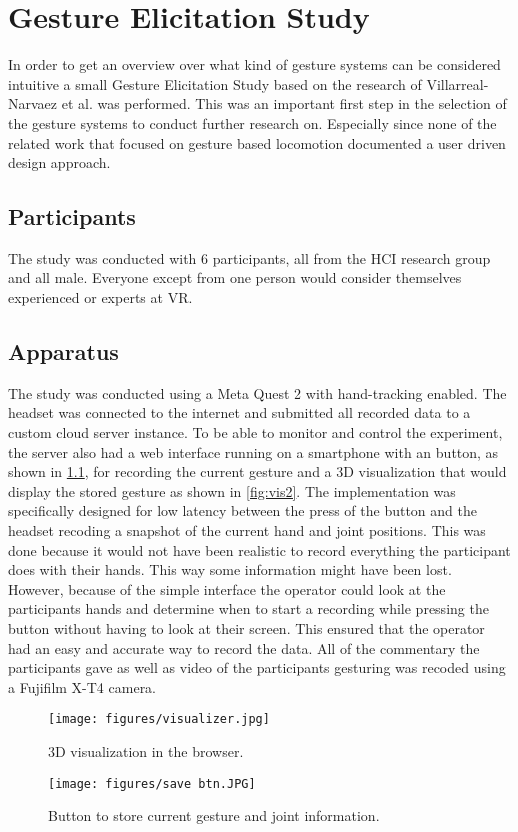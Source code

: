 \chapter{Gesture Elicitation Study}
In order to get an overview over what kind of gesture systems can be considered intuitive a small Gesture Elicitation Study based on the research of Villarreal-Narvaez et al. \cite{elicitation} was performed. This was an important first step in the selection of the gesture systems to conduct further research on. Especially since none of the related work that focused on gesture based locomotion documented a user driven design approach.

\section{Participants}
The study was conducted with 6 participants, all from the HCI research group and all male. Everyone except from one person would consider themselves experienced or experts at VR.

\section{Apparatus}
The study was conducted using a Meta Quest 2 with hand-tracking enabled. The headset was connected to the internet and submitted all recorded data to a custom cloud server instance. To be able to monitor and control the experiment, the server also had a web interface running on a smartphone with an button, as shown in \ref{fig:savebtn}, for recording the current gesture and a 3D visualization that would display the stored gesture as shown in \ref{fig:vis2}. The implementation was specifically designed for low latency between the press of the button and the headset recoding a snapshot of the current hand and joint positions. This was done because it would not have been realistic to record everything the participant does with their hands. This way some information might have been lost. However, because of the simple interface the operator could look at the participants hands and determine when to start a recording while pressing the button without having to look at their screen. This ensured that the operator had an easy and accurate way to record the data. All of the commentary the participants gave as well as video of the participants gesturing was recoded using a Fujifilm X-T4 camera. 

\begin{figure}[!htb]
        \texttt{[image: figures/visualizer.jpg]}
        \caption{3D visualization in the browser.}
        \label{fig:vis2}
    \endminipage\hfill
        \texttt{[image: figures/save btn.JPG]}
        \caption{Button to store current gesture and joint information.}
        \label{fig:savebtn}
    \endminipage\hfill
\end{figure}

